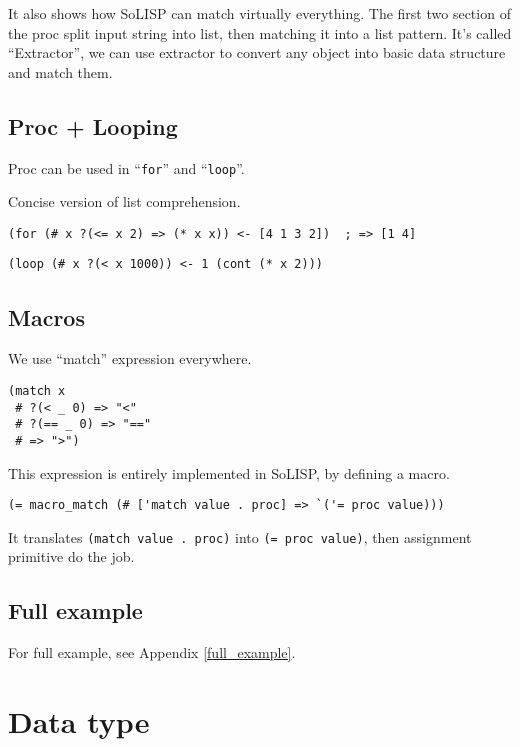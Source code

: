 \documentclass[a4paper,11pt]{article}
\begin{document}
It also shows how SoLISP can match virtually everything. The first two section of the proc split input string into list, then matching it into a list pattern. It's called ``Extractor'', we can use extractor to convert any object into basic data structure and match them.

\subsection{Proc + Looping}

Proc can be used in ``\verb|for|'' and ``\verb|loop|''.

Concise version of list comprehension. 

\begin{verbatim}
(for (# x ?(<= x 2) => (* x x)) <- [4 1 3 2])  ; => [1 4]
\end{verbatim}

\begin{verbatim}
(loop (# x ?(< x 1000)) <- 1 (cont (* x 2)))
\end{verbatim}

\subsection{Macros}

We use ``match'' expression everywhere.

\begin{verbatim}
(match x
 # ?(< _ 0) => "<"
 # ?(== _ 0) => "=="
 # => ">")
\end{verbatim}

This expression is entirely implemented in SoLISP, by defining a macro.

\begin{verbatim}
(= macro_match (# ['match value . proc] => `('= proc value)))
\end{verbatim}

It translates \verb|(match value . proc)| into \verb|(= proc value)|, then assignment primitive do the job.

\subsection{Full example}

For full example, see Appendix \ref{full_example}.

\section{Data type}
\end{document}
